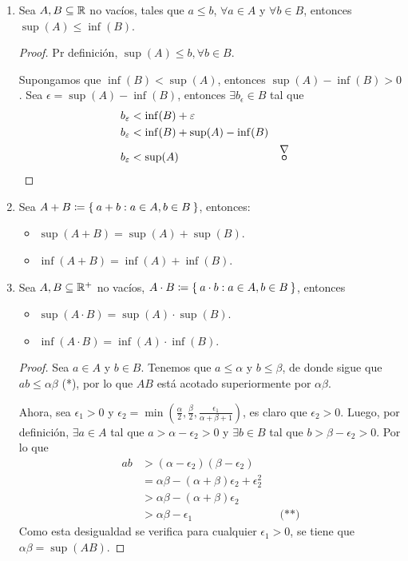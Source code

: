 \begin{enumerate}[label=\alph*)]
  \item Sea $A, B\subseteq \mathbb{R}$ no vacíos, tales que $a\leq b$, $\forall a\in A$ y $\forall b\in B$, entonces $\sup(A)\leq \inf(B)$.
  
  \begin{proof}\leavevmode
    
  Pr definición, $\sup (A) \leq b, \forall b\in B$.
  
  Supongamos que $\inf(B) < \sup(A)$, entonces $\sup(A) - \inf(B) > 0$. Sea $\epsilon = \sup(A) - \inf(B)$, entonces $\exists b_\epsilon\in B$ tal que
    \begin{align*}
      b_\epsilon &< \inf(B) + \epsilon\\
      b_\epsilon &< \inf(B) + \sup(A) - \inf(B)\\
      b_\epsilon &< \sup(A) && \contradiction
    \end{align*}
  \end{proof}
  
  \item Sea $A+B \coloneqq \Set{a+b: a\in A, b\in B}$, entonces:
  \begin{itemize}
    \item $\sup(A + B) = \sup(A) + \sup(B)$.
    \item $\inf(A + B) = \inf(A) + \inf(B)$.
  \end{itemize}
  
  \item Sea $A, B\subseteq \mathbb{R}^+$ no vacíos, $A\cdot B \coloneqq \Set{a\cdot b: a\in A, b\in B}$, entonces
  \begin{itemize}
    \item $\sup(A\cdot B) = \sup(A) \cdot \sup(B)$.
    \item $\inf(A\cdot B) = \inf(A) \cdot \inf(B)$.
  \end{itemize}
  
  \begin{proof}\leavevmode
    Sea $a\in A$ y $b\in B$. Tenemos que $a\leq \alpha$ y $b\leq \beta$, de donde sigue que $ab \leq \alpha\beta$ (*), por lo que $AB$ está acotado superiormente por $\alpha\beta$.
    
    Ahora, sea $\epsilon_1>0$ y $\epsilon_2 = \min \left(\frac{\alpha}{2}, \frac{\beta}{2}, \frac{\epsilon_1}{\alpha+\beta+1}\right)$, es claro que $\epsilon_2>0$. Luego, por definición, $\exists a\in A$ tal que $a > \alpha - \epsilon_2 > 0$ y $\exists b\in B$ tal que $b>\beta - \epsilon_2 >0$. Por lo que
    \begin{align*}
      ab &> (\alpha - \epsilon_2) (\beta - \epsilon_2) \\
      &= \alpha\beta - (\alpha + \beta)\epsilon_2 + \epsilon^2_2\\
      &> \alpha\beta - (\alpha+\beta)\epsilon_2\\
      &> \alpha\beta - \epsilon_1 && \text{(**)}
    \end{align*}
    Como esta desigualdad se verifica para cualquier $\epsilon_1>0$, se tiene que $\alpha\beta = \sup(AB)$.
  \end{proof}
  

\end{enumerate}
